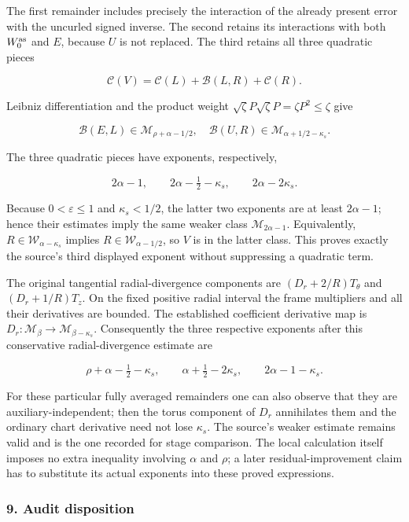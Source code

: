 \documentclass[10pt,a4paper]{article}
\begin{document}
The first remainder includes precisely the interaction of the already present error with the uncurled signed inverse. The second retains its interactions with both \(W_0^{\rm as}\) and \(E\), because \(U\) is not replaced. The third retains all three quadratic pieces

\[
\mathcal C(V)=\mathcal C(L)+\mathcal B(L,R)+\mathcal C(R).
\]

Leibniz differentiation and the product weight \(\sqrt\zeta P\sqrt\zeta P=\zeta P^2\le\zeta\) give

\[
\mathcal B(E,L)\in\mathcal M_{\rho+\alpha-1/2},
\quad
\mathcal B(U,R)\in\mathcal M_{\alpha+1/2-\kappa_s}.
\]

The three quadratic pieces have exponents, respectively,

\[
2\alpha-1,\qquad 2\alpha-\tfrac12-\kappa_s,
\qquad 2\alpha-2\kappa_s.
\]

Because \(0<\varepsilon\le1\) and \(\kappa_s<1/2\), the latter two exponents are at least \(2\alpha-1\); hence their estimates imply the same weaker class \(\mathcal M_{2\alpha-1}\). Equivalently, \(R\in\mathcal W_{\alpha-\kappa_s}\) implies \(R\in\mathcal W_{\alpha-1/2}\), so \(V\) is in the latter class. This proves exactly the source's third displayed exponent without suppressing a quadratic term.

The original tangential radial-divergence components are \((D_r+2/R)T_\theta\) and \((D_r+1/R)T_z\). On the fixed positive radial interval the frame multipliers and all their derivatives are bounded. The established coefficient derivative map is \(D_r:\mathcal M_\beta\to\mathcal M_{\beta-\kappa_s}\). Consequently the three respective exponents after this conservative radial-divergence estimate are

\[
\rho+\alpha-\tfrac12-\kappa_s,
\qquad \alpha+\tfrac12-2\kappa_s,
\qquad 2\alpha-1-\kappa_s.
\]

For these particular fully averaged remainders one can also observe that they are auxiliary-independent; then the torus component of \(D_r\) annihilates them and the ordinary chart derivative need not lose \(\kappa_s\). The source's weaker estimate remains valid and is the one recorded for stage comparison. The local calculation itself imposes no extra inequality involving \(\alpha\) and \(\rho\); a later residual-improvement claim has to substitute its actual exponents into these proved expressions.

\subsubsection{9. Audit disposition}
\end{document}
